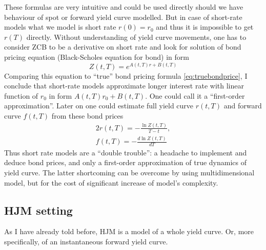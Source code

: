\documentclass[11pt]{article} %
\begin{document}
These formulas are very intuitive and could be used directly should we have behaviour of spot or forward yield curve modelled. But in case of short-rate models what we model is short rate $r(0) = r_0$ and thus it is impossible to get $r(T)$ directly. Without understanding of yield curve movements, one has to consider ZCB to be a derivative on short rate and look for solution of bond pricing equation (Black-Scholes equation for bond) in form 
\begin{equation} 
Z(t,T) = e^{A(t,T) r + B(t,T)}
\end{equation}
Comparing this equation to ``true'' bond pricing formula \eqref{eq:truebondprice}, I conclude that short-rate models approximate longer interest rate with linear function of $r_0$ in form $A(t,T) r_0 + B(t,T)$. One could call it a ``first-order approximation''. Later on one could estimate full yield curve $r(t,T)$ and forward curve $f(t,T)$ from these bond prices
\begin{alignat}{2}
r(t,T) = -\frac{\ln Z(t,T)}{T-t},\\
\label{eq:fwdfrombond} f(t,T) = -\frac{d \ln Z(t,T)}{dT}
\end{alignat}
Thus short rate models are a ``double trouble'': a headache to implement and deduce bond prices, and only a first-order approximation of true dynamics of yield curve. The latter shortcoming can be overcome by using multidimensional model, but for the cost of significant increase of model's complexity.\\

\subsection{HJM setting}

As I have already told before, HJM is a model of a whole yield curve. Or, more specifically, of an instantaneous forward yield curve.\\
\end{document}
